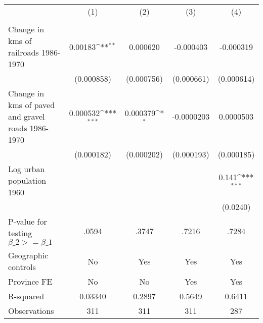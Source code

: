 {
\def\sym#1{\ifmmode^{#1}\else\(^{#1}\)\fi}
\begin{tabular}{l*{4}{c}}
\hline\hline
                &\multicolumn{1}{c}{(1)}&\multicolumn{1}{c}{(2)}&\multicolumn{1}{c}{(3)}&\multicolumn{1}{c}{(4)}\\
                &\multicolumn{1}{c}{}&\multicolumn{1}{c}{}&\multicolumn{1}{c}{}&\multicolumn{1}{c}{}\\
\hline
Change in kms of railroads 1986-1970&  0.00183\sym{**} & 0.000620         &-0.000403         &-0.000319         \\
                &(0.000858)         &(0.000756)         &(0.000661)         &(0.000614)         \\
[1em]
Change in kms of paved and gravel roads 1986-1970& 0.000532\sym{***}& 0.000379\sym{*}  &-0.0000203         &0.0000503         \\
                &(0.000182)         &(0.000202)         &(0.000193)         &(0.000185)         \\
[1em]
Log urban population 1960&                  &                  &                  &    0.141\sym{***}\\
                &                  &                  &                  & (0.0240)         \\
\hline
P-value for testing $\beta\_{2} >= \beta\_{1}$&    .0594         &    .3747         &    .7216         &    .7284         \\
Geographic controls&       No         &      Yes         &      Yes         &      Yes         \\
Province FE     &       No         &       No         &      Yes         &      Yes         \\
R-squared       &  0.03340         &   0.2897         &   0.5649         &   0.6411         \\
Observations    &      311         &      311         &      311         &      287         \\
\hline\hline
\end{tabular}
}
